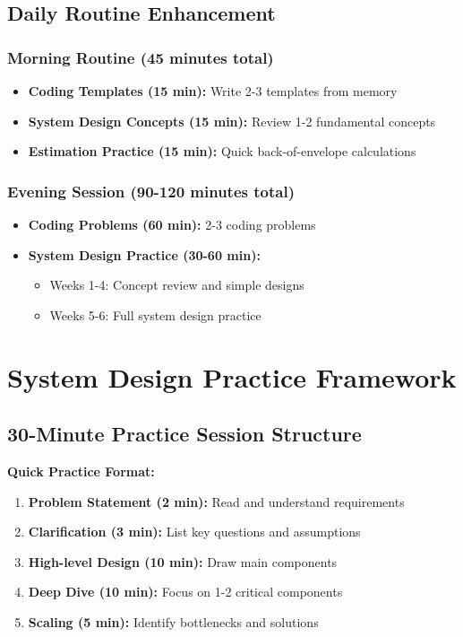 \documentclass[10pt,a4paper]{article}
\begin{document}
\subsection{Daily Routine Enhancement}

\subsubsection{Morning Routine (45 minutes total)}
\begin{itemize}
\item \textbf{Coding Templates (15 min):} Write 2-3 templates from memory
\item \textbf{System Design Concepts (15 min):} Review 1-2 fundamental concepts
\item \textbf{Estimation Practice (15 min):} Quick back-of-envelope calculations
\end{itemize}

\subsubsection{Evening Session (90-120 minutes total)}
\begin{itemize}
\item \textbf{Coding Problems (60 min):} 2-3 coding problems
\item \textbf{System Design Practice (30-60 min):}
  \begin{itemize}
  \item Weeks 1-4: Concept review and simple designs
  \item Weeks 5-6: Full system design practice
  \end{itemize}
\end{itemize}

\section{System Design Practice Framework}

\subsection{30-Minute Practice Session Structure}

\begin{frameworkbox}
\textbf{Quick Practice Format:}
\begin{enumerate}
\item \textbf{Problem Statement (2 min):} Read and understand requirements
\item \textbf{Clarification (3 min):} List key questions and assumptions
\item \textbf{High-level Design (10 min):} Draw main components
\item \textbf{Deep Dive (10 min):} Focus on 1-2 critical components
\item \textbf{Scaling (5 min):} Identify bottlenecks and solutions
\end{enumerate}
\end{frameworkbox}
\end{document}
